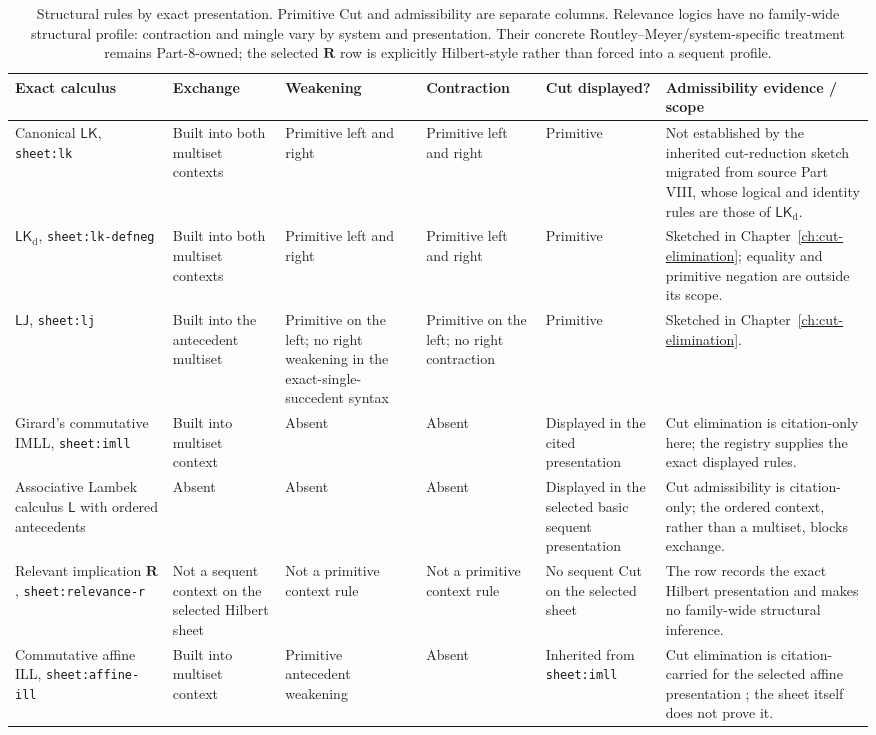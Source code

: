 \begin{table}[!htbp]
\centering
\begingroup\scriptsize
\setlength{\tabcolsep}{3pt}
\begin{tabular}{@{}p{}p{}p{}
  p{}p{}p{}@{}}
\toprule
Exact calculus & Exchange & Weakening & Contraction & Cut displayed? &
Admissibility evidence / scope \\
\midrule
Canonical \(\mathsf{LK}\), \texttt{sheet:lk} & Built into both multiset
contexts & Primitive left and right & Primitive left and right & Primitive &
Not established by the inherited cut-reduction sketch migrated from source
Part VIII, whose logical and identity rules are those of
\(\mathsf{LK}_{\mathrm d}\). \\
\(\mathsf{LK}_{\mathrm d}\), \texttt{sheet:lk-defneg} & Built into both
multiset contexts & Primitive left and right & Primitive left and right &
Primitive & Sketched in Chapter~\ref{ch:cut-elimination}; equality and
primitive negation are outside its scope. \\
\(\mathsf{LJ}\), \texttt{sheet:lj} & Built into the antecedent multiset &
Primitive on the left; no right weakening in the exact-single-succedent
syntax & Primitive on the left; no right contraction & Primitive & Sketched
in Chapter~\ref{ch:cut-elimination}. \\
Girard's commutative IMLL, \texttt{sheet:imll} & Built into multiset context &
Absent & Absent & Displayed in the cited presentation & Cut elimination is
citation-only here; the registry supplies the exact displayed rules. \\
Associative Lambek calculus \(\mathsf L\) with ordered antecedents & Absent &
Absent & Absent & Displayed in the selected basic sequent presentation &
Cut admissibility is citation-only; the ordered context, rather than a
multiset, blocks exchange. \\
Relevant implication \(\mathbf R\), \texttt{sheet:relevance-r} & Not a sequent
context on the selected Hilbert sheet & Not a primitive context rule & Not a
primitive context rule & No sequent Cut on the selected sheet & The row records
the exact Hilbert presentation and makes no family-wide structural inference. \\
Commutative affine ILL, \texttt{sheet:affine-ill} & Built into multiset context &
Primitive antecedent weakening & Absent & Inherited from \texttt{sheet:imll} &
Cut elimination is citation-carried for the selected affine presentation
\cite{Lincoln1995}; the sheet itself does not prove it. \\
\bottomrule
\end{tabular}
\endgroup
\caption{Structural rules by exact presentation.  Primitive
Cut and admissibility are separate columns.  Relevance logics have no
family-wide structural profile: contraction and mingle vary by system and
presentation. Their concrete Routley--Meyer/system-specific treatment remains
Part-8-owned; the selected \(\mathbf R\) row is explicitly Hilbert-style rather
than forced into a sequent profile.}
\label{tab:p07-structural-rules}
\end{table}

